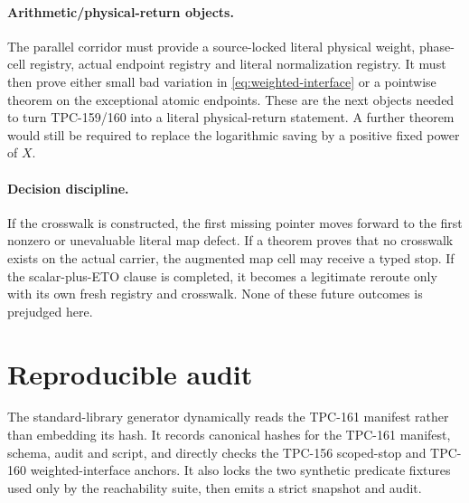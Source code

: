 \documentclass[11pt]{article}
\theoremstyle{definition}
\theoremstyle{remark}
\begin{document}
\paragraph{Arithmetic/physical-return objects.}
The parallel corridor must provide a source-locked literal physical
weight, phase-cell registry, actual endpoint registry and literal
normalization registry.  It must then prove either small bad variation
in \cref{eq:weighted-interface} or a pointwise theorem on the
exceptional atomic endpoints.  These are the next objects needed to
turn TPC-159/160 into a literal physical-return statement.  A further
theorem would still be required to replace the logarithmic saving by
a positive fixed power of \(X\).

\paragraph{Decision discipline.}
If the crosswalk is constructed, the first missing pointer moves
forward to the first nonzero or unevaluable literal map defect.  If a
theorem proves that no crosswalk exists on the actual carrier, the
augmented map cell may receive a typed stop.  If the scalar-plus-ETO
clause is completed, it becomes a legitimate reroute only with its
own fresh registry and crosswalk.  None of these future outcomes is
prejudged here.

\section{Reproducible audit}

The standard-library generator dynamically reads the TPC-161
manifest rather than embedding its hash.  It records canonical hashes
for the TPC-161 manifest, schema, audit and script, and directly checks
the TPC-156 scoped-stop and TPC-160 weighted-interface anchors.
It also locks the two synthetic predicate fixtures used only by the
reachability suite, then emits a strict snapshot and audit.
\end{document}

